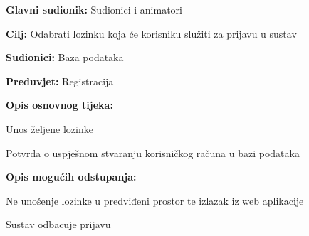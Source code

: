 \vspace{5mm} %
\noindent {}
\begin{packed_item}

	\item \textbf{Glavni sudionik: }Sudionici i animatori
	\item  \textbf{Cilj:} Odabrati lozinku koja će korisniku služiti za prijavu u sustav
	\item  \textbf{Sudionici:} Baza podataka
	\item  \textbf{Preduvjet:} Registracija
	\item  \textbf{Opis osnovnog tijeka:}

	\item[] \begin{packed_enum}

				\item Unos željene lozinke
				\item Potvrda o uspješnom stvaranju korisničkog računa u bazi podataka
	\end{packed_enum}

	\item  \textbf{Opis mogućih odstupanja:}

	\item[] \begin{packed_item}

				\item[2.a] Ne unošenje lozinke u predviđeni prostor te izlazak iz web aplikacije
				\item[] \begin{packed_enum}

							\item Sustav odbacuje prijavu

				\end{packed_enum}


	\end{packed_item}
\end{packed_item}
\vspace{5mm} %

